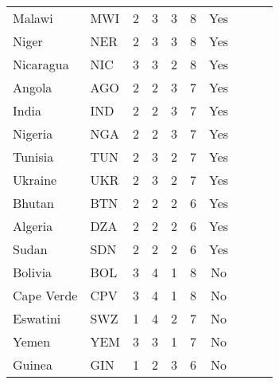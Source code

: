 \begin{singlespace}
{\begin{longtable}{l l c c c c c c c c}
Malawi                     & MWI           & 2          & 3                   & 3         & 8                 & Yes             \\
Niger                      & NER           & 2          & 3                   & 3         & 8                 & Yes             \\
Nicaragua                  & NIC           & 3          & 3                   & 2         & 8                 & Yes             \\
Angola                     & AGO           & 2          & 2                   & 3         & 7                 & Yes             \\
India                      & IND           & 2          & 2                   & 3         & 7                 & Yes             \\
Nigeria                    & NGA           & 2          & 2                   & 3         & 7                 & Yes             \\
Tunisia                    & TUN           & 2          & 3                   & 2         & 7                 & Yes             \\
Ukraine                    & UKR           & 2          & 3                   & 2         & 7                 & Yes             \\
Bhutan                     & BTN           & 2          & 2                   & 2         & 6                 & Yes             \\
Algeria                    & DZA           & 2          & 2                   & 2         & 6                 & Yes             \\
Sudan                      & SDN           & 2          & 2                   & 2         & 6                 & Yes             \\
Bolivia                    & BOL           & 3          & 4                   & 1         & 8                 & No              \\
Cape Verde                 & CPV           & 3          & 4                   & 1         & 8                 & No              \\
Eswatini                   & SWZ           & 1          & 4                   & 2         & 7                 & No              \\
Yemen                      & YEM           & 3          & 3                   & 1         & 7                 & No              \\
Guinea                     & GIN           & 1          & 2                   & 3         & 6                 & No              \\

\end{longtable}}
\end{singlespace}
